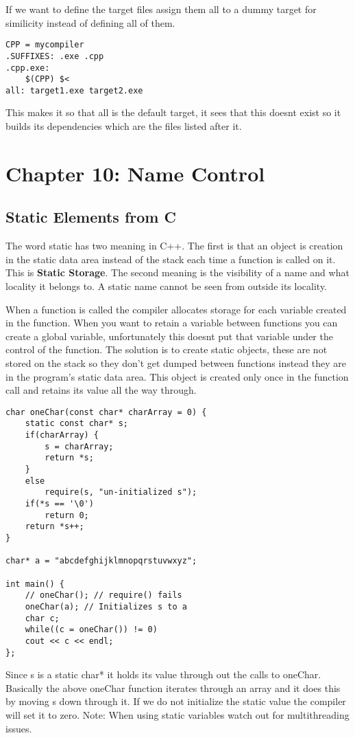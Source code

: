 \documentclass[12pt]{article}
\begin{document}
If we want to define the target files assign them all to a dummy target for similicity instead of defining all of them.
\begin{lstlisting}
CPP = mycompiler
.SUFFIXES: .exe .cpp
.cpp.exe:
    $(CPP) $<
all: target1.exe target2.exe
\end{lstlisting}

This makes it so that all is the default target, it sees that this doesnt exist so it builds its dependencies which are the files listed after it.


\section*{Chapter 10: Name Control}
\subsection*{Static Elements from C}
The word static has two meaning in C++. The first is that an object is creation in the static data area instead of the stack each time a function is called on it. This is \textbf{Static Storage}. The second meaning is the visibility of a name and what locality it belongs to. A static name cannot be seen from outside its locality.

When a function is called the compiler allocates storage for each variable created in the function. When you want to retain a variable between functions you can create a global variable, unfortunately this doesnt put that variable under the control of the function. The solution is to create static objects, these are not stored on the stack so they don't get dumped between functions instead they are in the program's static data area. This object is created only once in the function call and retains its value all the way through.
\begin{lstlisting}
char oneChar(const char* charArray = 0) {
    static const char* s;
    if(charArray) {
        s = charArray;
        return *s;
    }
    else
        require(s, "un-initialized s");
    if(*s == '\0')
        return 0;
    return *s++;
}

char* a = "abcdefghijklmnopqrstuvwxyz";

int main() {
    // oneChar(); // require() fails
    oneChar(a); // Initializes s to a
    char c;
    while((c = oneChar()) != 0)
    cout << c << endl;
};
\end{lstlisting}
Since s is a static char* it holds its value through out the calls to oneChar. Basically the above oneChar function iterates through an array and it does this by moving s down through it. If we do not initialize the static value the compiler will set it to zero. Note: When using static variables watch out for multithreading issues.
\end{document}

